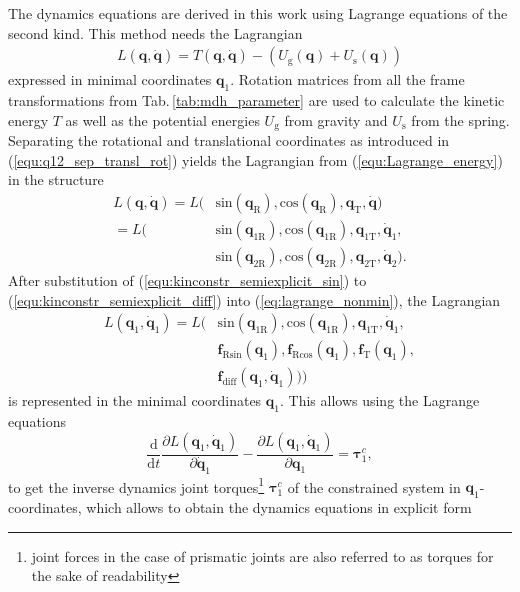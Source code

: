 \documentclass[twocolumn,10pt]{IFTOMM}
\newcommand{\bm}[1]{\boldsymbol{#1}}
\begin{document}
The dynamics equations are derived in this work using Lagrange equations of the second kind. This method needs the Lagrangian 
%
\begin{align}
L(\bm{q},\dot{\bm{q}}) = T(\bm{q},\dot{\bm{q}})-(U_{\mathrm{g}}(\bm{q})+U_{\mathrm{s}}(\bm{q}))
\label{equ:Lagrange_energy}
\end{align}
%
expressed in minimal coordinates $\bm{q}_{1}$.
Rotation matrices from all the frame transformations from Tab.\,\ref{tab:mdh_parameter} are used to calculate the kinetic energy $T$ as well as the potential energies $U_{\mathrm{g}}$ from gravity and $U_{\mathrm{s}}$ from the spring.
Separating the rotational and translational coordinates as introduced in (\ref{equ:q12_sep_transl_rot}) yields the Lagrangian from (\ref{equ:Lagrange_energy}) in the structure
%
\begin{align}
L(\bm{q},\dot{\bm{q}}) =L( & \mathrm{sin}  (\bm{q}_{\mathrm{R}}),\mathrm{cos}(\bm{q}_{\mathrm{R}}), \bm{q}_{\mathrm{T}},\dot{\bm{q}}) \\\label{eq:lagrange_nonmin}
=L( & \mathrm{sin}  (\bm{q}_{1\mathrm{R}}),\mathrm{cos}(\bm{q}_{1\mathrm{R}}), \bm{q}_{1\mathrm{T}},\dot{\bm{q}}_{1}, \nonumber \\
& \mathrm{sin}  (\bm{q}_{2\mathrm{R}}),\mathrm{cos}(\bm{q}_{2\mathrm{R}}), \bm{q}_{2\mathrm{T}},\dot{\bm{q}}_{2}).
\end{align}
%
After substitution of (\ref{equ:kinconstr_semiexplicit_sin}) to (\ref{equ:kinconstr_semiexplicit_diff}) into (\ref{eq:lagrange_nonmin}), the Lagrangian 
%
\begin{align}
L(\bm{q}_1,\dot{\bm{q}}_1)=L( & \mathrm{sin} (\bm{q}_{1\mathrm{R}}),\mathrm{cos}(\bm{q}_{1\mathrm{R}}), \bm{q}_{1\mathrm{T}},\dot{\bm{q}}_{1}, \\
 & \bm{f}_{\mathrm{R}\mathrm{sin}}(\bm{q}_1),
\bm{f}_{\mathrm{R}\mathrm{cos}}(\bm{q}_1),
\bm{f}_{\mathrm{T}}(\bm{q}_1),\\
& \bm{f}_{\mathrm{diff}}(\bm{q}_1,\dot{\bm{q}}_1))) \nonumber
\end{align}
%
is represented in the minimal coordinates $\bm{q}_1$.
This allows using the Lagrange equations
%
\begin{equation}
\frac{\mathrm{d}}{\mathrm{d}t}\frac{\partial L(\bm{q}_1,\dot{\bm{q}}_1)}{\partial \dot{\bm{q}}_1} - \frac{\partial L(\bm{q}_1,\dot{\bm{q}}_1)}{\partial \bm{q}_1}= \bm{\tau}^c_1,
\end{equation}
%
to get the inverse dynamics joint torques\footnote{joint forces in the case of prismatic joints are also referred to as torques for the sake of readability} $\bm{\tau}^c_1$ of the constrained system in $\bm{q}_1$-coordinates, which allows to obtain the dynamics equations in explicit form
\end{document}
